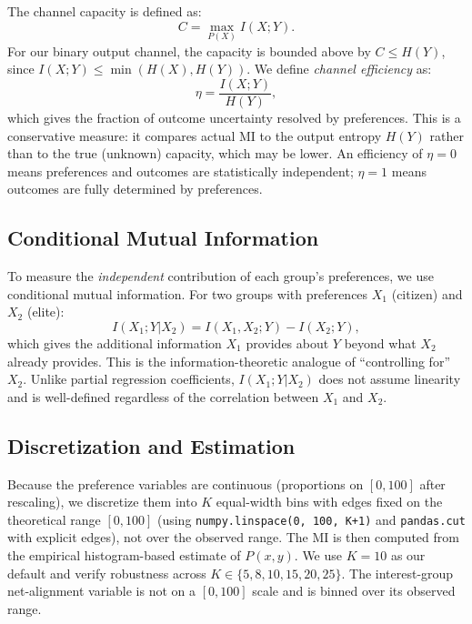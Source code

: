 \documentclass[twocolumn,10pt]{article}
\begin{document}
The channel capacity is defined as:
\begin{equation}
C = \max_{P(X)} I(X;Y).
\label{eq:capacity}
\end{equation}
For our binary output channel, the capacity is bounded above by $C \leq H(Y)$, since $I(X;Y) \leq \min(H(X), H(Y))$.  We define \emph{channel efficiency} as:
\begin{equation}
\eta = \frac{I(X;Y)}{H(Y)},
\label{eq:efficiency}
\end{equation}
which gives the fraction of outcome uncertainty resolved by preferences.  This is a conservative measure: it compares actual MI to the output entropy $H(Y)$ rather than to the true (unknown) capacity, which may be lower.  An efficiency of $\eta = 0$ means preferences and outcomes are statistically independent; $\eta = 1$ means outcomes are fully determined by preferences.

\subsection{Conditional Mutual Information}

To measure the \emph{independent} contribution of each group's preferences, we use conditional mutual information.  For two groups with preferences $X_1$ (citizen) and $X_2$ (elite):
\begin{equation}
I(X_1; Y | X_2) = I(X_1, X_2; Y) - I(X_2; Y),
\label{eq:cmi}
\end{equation}
which gives the additional information $X_1$ provides about $Y$ beyond what $X_2$ already provides.  This is the information-theoretic analogue of ``controlling for'' $X_2$.  Unlike partial regression coefficients, $I(X_1; Y | X_2)$ does not assume linearity and is well-defined regardless of the correlation between $X_1$ and $X_2$.

\subsection{Discretization and Estimation}

Because the preference variables are continuous (proportions on $[0,100]$ after rescaling), we discretize them into $K$ equal-width bins with edges fixed on the theoretical range $[0, 100]$ (using \texttt{numpy.linspace(0, 100, K+1)} and \texttt{pandas.cut} with explicit edges), not over the observed range.  The MI is then computed from the empirical histogram-based estimate of $P(x,y)$.  We use $K = 10$ as our default and verify robustness across $K \in \{5, 8, 10, 15, 20, 25\}$.  The interest-group net-alignment variable is not on a $[0, 100]$ scale and is binned over its observed range.
\end{document}
